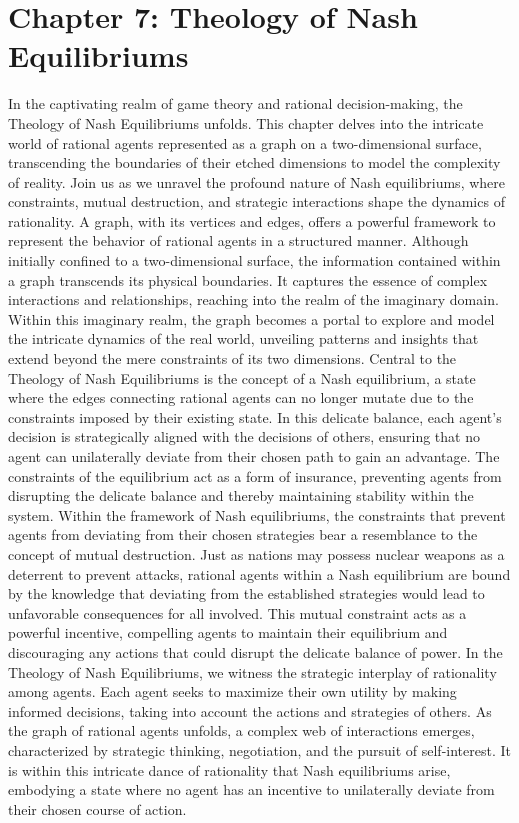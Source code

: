 \documentclass[ebook,12pt,oneside,openany]{memoir}
\begin{document}
\chapter*{Chapter 7: Theology of Nash Equilibriums}
In the captivating realm of game theory and rational decision-making, the Theology of Nash Equilibriums unfolds. This chapter delves into the intricate world of rational agents represented as a graph on a two-dimensional surface, transcending the boundaries of their etched dimensions to model the complexity of reality. Join us as we unravel the profound nature of Nash equilibriums, where constraints, mutual destruction, and strategic interactions shape the dynamics of rationality.
A graph, with its vertices and edges, offers a powerful framework to represent the behavior of rational agents in a structured manner. Although initially confined to a two-dimensional surface, the information contained within a graph transcends its physical boundaries. It captures the essence of complex interactions and relationships, reaching into the realm of the imaginary domain. Within this imaginary realm, the graph becomes a portal to explore and model the intricate dynamics of the real world, unveiling patterns and insights that extend beyond the mere constraints of its two dimensions.
Central to the Theology of Nash Equilibriums is the concept of a Nash equilibrium, a state where the edges connecting rational agents can no longer mutate due to the constraints imposed by their existing state. In this delicate balance, each agent's decision is strategically aligned with the decisions of others, ensuring that no agent can unilaterally deviate from their chosen path to gain an advantage. The constraints of the equilibrium act as a form of insurance, preventing agents from disrupting the delicate balance and thereby maintaining stability within the system.
Within the framework of Nash equilibriums, the constraints that prevent agents from deviating from their chosen strategies bear a resemblance to the concept of mutual destruction. Just as nations may possess nuclear weapons as a deterrent to prevent attacks, rational agents within a Nash equilibrium are bound by the knowledge that deviating from the established strategies would lead to unfavorable consequences for all involved. This mutual constraint acts as a powerful incentive, compelling agents to maintain their equilibrium and discouraging any actions that could disrupt the delicate balance of power.
In the Theology of Nash Equilibriums, we witness the strategic interplay of rationality among agents. Each agent seeks to maximize their own utility by making informed decisions, taking into account the actions and strategies of others. As the graph of rational agents unfolds, a complex web of interactions emerges, characterized by strategic thinking, negotiation, and the pursuit of self-interest. It is within this intricate dance of rationality that Nash equilibriums arise, embodying a state where no agent has an incentive to unilaterally deviate from their chosen course of action.
\end{document}
